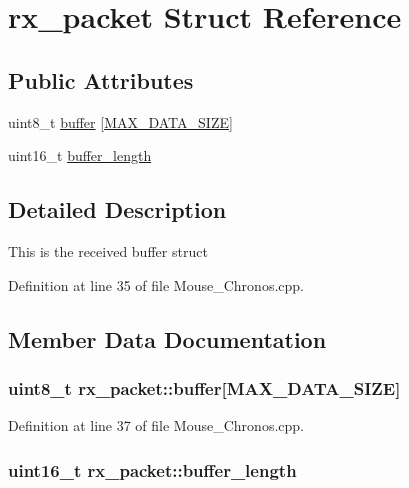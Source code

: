 \hypertarget{structrx__packet}{\section{rx\-\_\-packet \-Struct \-Reference}
\label{structrx__packet}
}
\subsection*{\-Public \-Attributes}
\begin{DoxyCompactItemize}
\item 
uint8\-\_\-t \hyperlink{structrx__packet_a11210b9e5c40f2b0a9be7952e1225fa1}{buffer} \mbox{[}\hyperlink{_mouse___chronos_8cpp_a87f68e96fb938eddc39ad1f19d923a96}{\-M\-A\-X\-\_\-\-D\-A\-T\-A\-\_\-\-S\-I\-Z\-E}\mbox{]}
\item 
uint16\-\_\-t \hyperlink{structrx__packet_af5e57a51909cbfdd401e3dbac6908657}{buffer\-\_\-length}
\end{DoxyCompactItemize}


\subsection{\-Detailed \-Description}
\-This is the received buffer struct 

\-Definition at line 35 of file \-Mouse\-\_\-\-Chronos.\-cpp.



\subsection{\-Member \-Data \-Documentation}
\hypertarget{structrx__packet_a11210b9e5c40f2b0a9be7952e1225fa1}{
\subsubsection[{buffer}]{\setlength{\rightskip}{0pt plus 5cm}uint8\-\_\-t {\bf rx\-\_\-packet\-::buffer}\mbox{[}{\bf \-M\-A\-X\-\_\-\-D\-A\-T\-A\-\_\-\-S\-I\-Z\-E}\mbox{]}}}\label{structrx__packet_a11210b9e5c40f2b0a9be7952e1225fa1}


\-Definition at line 37 of file \-Mouse\-\_\-\-Chronos.\-cpp.

\hypertarget{structrx__packet_af5e57a51909cbfdd401e3dbac6908657}{
\subsubsection[{buffer\-\_\-length}]{\setlength{\rightskip}{0pt plus 5cm}uint16\-\_\-t {\bf rx\-\_\-packet\-::buffer\-\_\-length}}}\label{structrx__packet_af5e57a51909cbfdd401e3dbac6908657}


